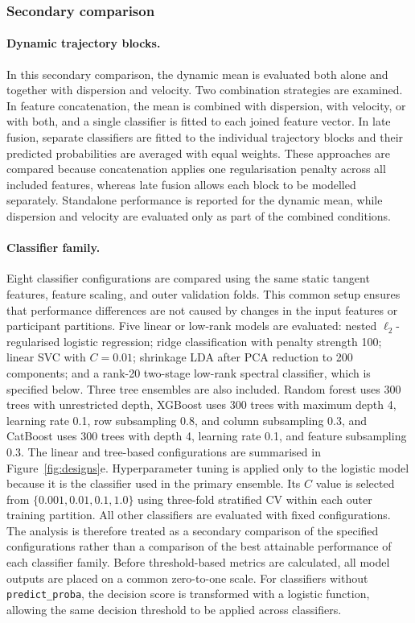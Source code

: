 \subsubsection{Secondary comparison}
\label{subsubsec:secondary-comparisons}

\paragraph{\textbf{Dynamic trajectory blocks.}}
\label{par:trajectory-blocks}
In this secondary comparison, the dynamic mean is evaluated both alone and together with dispersion and velocity. Two combination strategies are examined. In feature concatenation, the mean is combined with dispersion, with velocity, or with both, and a single classifier is fitted to each joined feature vector. In late fusion, separate classifiers are fitted to the individual trajectory blocks and their predicted probabilities are averaged with equal weights. These approaches are compared because concatenation applies one regularisation penalty across all included features, whereas late fusion allows each block to be modelled separately. Standalone performance is reported for the dynamic mean, while dispersion and velocity are evaluated only as part of the combined conditions.

\paragraph{\textbf{Classifier family.}}
\label{par:classifier-family}
Eight classifier configurations are compared using the same static tangent features, feature scaling, and outer validation folds. This common setup ensures that performance differences are not caused by changes in the input features or participant partitions. Five linear or low-rank models are evaluated: nested $\ell_2$-regularised logistic regression; ridge classification with penalty strength 100; linear SVC with $C=0.01$; shrinkage LDA after PCA reduction to 200 components; and a rank-20 two-stage low-rank spectral classifier, which is specified below. Three tree ensembles are also included. Random forest uses 300 trees with unrestricted depth, XGBoost uses 300 trees with maximum depth 4, learning rate 0.1, row subsampling 0.8, and column subsampling 0.3, and CatBoost \citep{Prokhorenkovaetal2018} uses 300 trees with depth 4, learning rate 0.1, and feature subsampling 0.3. The linear and tree-based configurations are summarised in Figure~\ref{fig:designs}e. Hyperparameter tuning is applied only to the logistic model because it is the classifier used in the primary ensemble. Its $C$ value is selected from $\{0.001,0.01,0.1,1.0\}$ using three-fold stratified CV within each outer training partition. All other classifiers are evaluated with fixed configurations. The analysis is therefore treated as a secondary comparison of the specified configurations rather than a comparison of the best attainable performance of each classifier family. Before threshold-based metrics are calculated, all model outputs are placed on a common zero-to-one scale. For classifiers without \texttt{predict\_proba}, the decision score is transformed with a logistic function, allowing the same decision threshold to be applied across classifiers.

